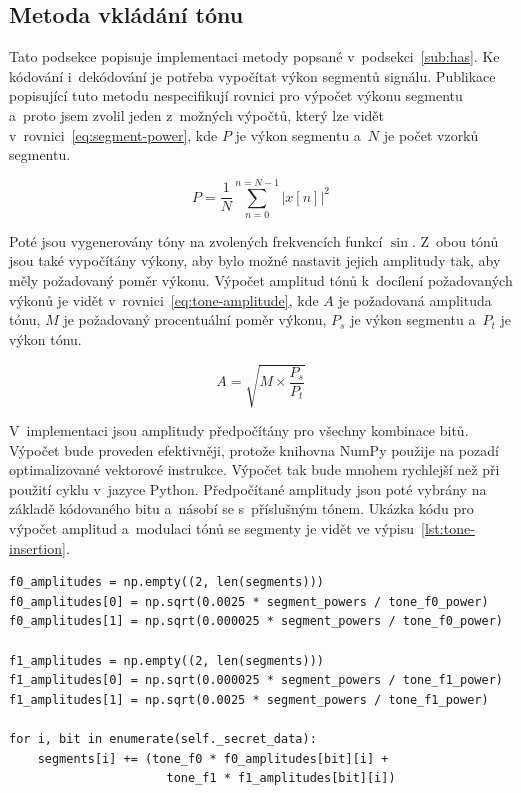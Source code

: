 \subsection*{Metoda vkládání tónu}
\label{sub:tone-insertion-implementation}

Tato podsekce popisuje implementaci metody popsané v~podsekci~\ref{sub:has}. Ke
kódování i~dekódování je potřeba vypočítat výkon segmentů signálu. Publikace
popisující tuto metodu nespecifikují rovnici pro výpočet výkonu segmentu
a~proto jsem zvolil jeden z~možných výpočtů, který lze vidět
v~rovnici~\ref{eq:segment-power}, kde $P$ je výkon segmentu a~$N$ je počet
vzorků segmentu.

\begin{equation}
    \label{eq:segment-power}
    P = \frac{1}{N} \sum_{n=0}^{n=N-1}{|x[n]|^2}
\end{equation}

\noindent Poté jsou vygenerovány tóny na zvolených frekvencích funkcí $\sin$.
Z~obou tónů jsou také vypočítány výkony, aby bylo možné nastavit jejich
amplitudy tak, aby měly požadovaný poměr výkonu. Výpočet amplitud tónů
k~docílení požadovaných výkonů je vidět v~rovnici~\ref{eq:tone-amplitude}, kde
$A$ je požadovaná amplituda tónu, $M$ je požadovaný procentuální poměr výkonu,
$P_s$ je výkon segmentu a~$P_t$ je výkon tónu.

\begin{equation}
    \label{eq:tone-amplitude}
    A = \sqrt{M \times \frac{P_s}{P_t}}
\end{equation}

\noindent V~implementaci jsou amplitudy předpočítány pro všechny kombinace
bitů. Výpočet bude proveden efektivněji, protože knihovna NumPy použije na
pozadí optimalizované vektorové instrukce. Výpočet tak bude mnohem rychlejší
než při použití cyklu v~jazyce Python. Předpočítané amplitudy jsou poté vybrány
na základě kódovaného bitu a~násobí se s~příslušným tónem. Ukázka kódu pro
výpočet amplitud a~modulaci tónů se segmenty je vidět ve
výpisu~\ref{lst:tone-insertion}.

\begin{lstlisting}[language=PythonPlus, label={lst:tone-insertion},
caption={Výpočet amplitud a~přidání tónů k~segmentům.}, float]
f0_amplitudes = np.empty((2, len(segments)))
f0_amplitudes[0] = np.sqrt(0.0025 * segment_powers / tone_f0_power)
f0_amplitudes[1] = np.sqrt(0.000025 * segment_powers / tone_f0_power)

f1_amplitudes = np.empty((2, len(segments)))
f1_amplitudes[0] = np.sqrt(0.000025 * segment_powers / tone_f1_power)
f1_amplitudes[1] = np.sqrt(0.0025 * segment_powers / tone_f1_power)

for i, bit in enumerate(self._secret_data):
    segments[i] += (tone_f0 * f0_amplitudes[bit][i] +
                      tone_f1 * f1_amplitudes[bit][i])
\end{lstlisting}

